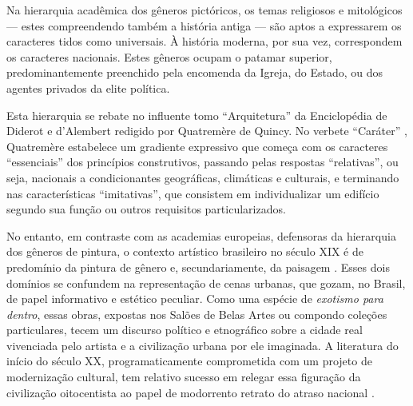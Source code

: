 Na hierarquia acadêmica dos gêneros pictóricos, os temas religiosos e
mitológicos --- estes compreendendo também a história antiga --- são
aptos a expressarem os caracteres tidos como universais. À história
moderna, por sua vez, correspondem os caracteres nacionais. Estes
gêneros ocupam o patamar superior, predominantemente preenchido pela
encomenda da Igreja, do Estado, ou dos agentes privados da elite
política.

Esta hierarquia se rebate no influente tomo ``Arquitetura'' da
Enciclopédia de Diderot e d'Alembert redigido por Quatremère de Quincy.
No verbete ``Caráter'' \autocite*{quatremere:1788caractere}, Quatremère
estabelece um gradiente expressivo que começa com os caracteres
``essenciais'' dos princípios construtivos, passando pelas respostas
``relativas'', ou seja, nacionais a condicionantes geográficas,
climáticas e culturais, e terminando nas características ``imitativas'',
que consistem em individualizar um edifício segundo sua função ou outros
requisitos particularizados.

No entanto, em contraste com as academias europeias, defensoras da
hierarquia dos gêneros de pintura, o contexto artístico brasileiro no
século XIX é de predomínio da pintura de gênero e, secundariamente, da
paisagem \autocite{squeff:2012galeria}. Esses dois domínios se confundem
na representação de cenas urbanas, que gozam, no Brasil, de papel
informativo e estético peculiar. Como uma espécie de \emph{exotismo para
dentro}, essas obras, expostas nos Salões de Belas Artes ou compondo
coleções particulares, tecem um discurso político e etnográfico sobre a
cidade real vivenciada pelo artista e a civilização urbana por ele
imaginada. A literatura do início do século XX, programaticamente
comprometida com um projeto de modernização cultural, tem relativo
sucesso em relegar essa figuração da civilização oitocentista ao papel
de modorrento retrato do atraso nacional
\autocite{bernd:1992literatura}.

